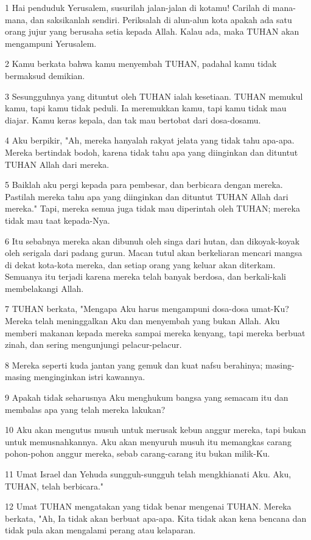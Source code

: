 \par 1 Hai penduduk Yerusalem, susurilah jalan-jalan di kotamu! Carilah di mana-mana, dan saksikanlah sendiri. Periksalah di alun-alun kota apakah ada satu orang jujur yang berusaha setia kepada Allah. Kalau ada, maka TUHAN akan mengampuni Yerusalem.
\par 2 Kamu berkata bahwa kamu menyembah TUHAN, padahal kamu tidak bermaksud demikian.
\par 3 Sesungguhnya yang dituntut oleh TUHAN ialah kesetiaan. TUHAN memukul kamu, tapi kamu tidak peduli. Ia meremukkan kamu, tapi kamu tidak mau diajar. Kamu keras kepala, dan tak mau bertobat dari dosa-dosamu.
\par 4 Aku berpikir, "Ah, mereka hanyalah rakyat jelata yang tidak tahu apa-apa. Mereka bertindak bodoh, karena tidak tahu apa yang diinginkan dan dituntut TUHAN Allah dari mereka.
\par 5 Baiklah aku pergi kepada para pembesar, dan berbicara dengan mereka. Pastilah mereka tahu apa yang diinginkan dan dituntut TUHAN Allah dari mereka." Tapi, mereka semua juga tidak mau diperintah oleh TUHAN; mereka tidak mau taat kepada-Nya.
\par 6 Itu sebabnya mereka akan dibunuh oleh singa dari hutan, dan dikoyak-koyak oleh serigala dari padang gurun. Macan tutul akan berkeliaran mencari mangsa di dekat kota-kota mereka, dan setiap orang yang keluar akan diterkam. Semuanya itu terjadi karena mereka telah banyak berdosa, dan berkali-kali membelakangi Allah.
\par 7 TUHAN berkata, "Mengapa Aku harus mengampuni dosa-dosa umat-Ku? Mereka telah meninggalkan Aku dan menyembah yang bukan Allah. Aku memberi makanan kepada mereka sampai mereka kenyang, tapi mereka berbuat zinah, dan sering mengunjungi pelacur-pelacur.
\par 8 Mereka seperti kuda jantan yang gemuk dan kuat nafsu berahinya; masing-masing menginginkan istri kawannya.
\par 9 Apakah tidak seharusnya Aku menghukum bangsa yang semacam itu dan membalas apa yang telah mereka lakukan?
\par 10 Aku akan mengutus musuh untuk merusak kebun anggur mereka, tapi bukan untuk memusnahkannya. Aku akan menyuruh musuh itu memangkas carang pohon-pohon anggur mereka, sebab carang-carang itu bukan milik-Ku.
\par 11 Umat Israel dan Yehuda sungguh-sungguh telah mengkhianati Aku. Aku, TUHAN, telah berbicara."
\par 12 Umat TUHAN mengatakan yang tidak benar mengenai TUHAN. Mereka berkata, "Ah, Ia tidak akan berbuat apa-apa. Kita tidak akan kena bencana dan tidak pula akan mengalami perang atau kelaparan.
